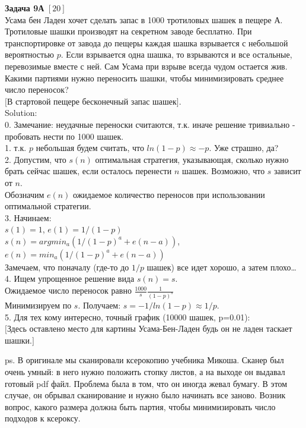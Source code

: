 \documentclass[12pt, a4paper]{article}\usepackage[]{graphicx}\usepackage[]{color}
\begin{document}
\textbf{Задача 9А} $[20]$ \\
Усама бен Ладен хочет сделать запас в 1000 тротиловых шашек в пещере А. Тротиловые шашки производят на секретном заводе бесплатно. При транспортировке от завода до пещеры каждая шашка взрывается с небольшой вероятностью $p$. Если взрывается одна шашка, то взрываются и все остальные, перевозимые вместе с ней. Сам Усама при взрыве всегда чудом остается жив. Какими партиями нужно переносить шашки, чтобы минимизировать среднее число переносок? \\
$[$В стартовой пещере бесконечный запас шашек$]$. \\
Solution: \\
0. Замечание: неудачные переноски считаются, т.к. иначе решение тривиально - пробовать нести по 1000 шашек.\\
1. т.к. $p$ небольшая будем считать, что $ln(1-p)\approx -p$. Уже страшно, да? \\
2. Допустим, что $s(n)$ оптимальная стратегия, указывающая, сколько нужно брать сейчас шашек, если осталось перенести $n$ шашек. Возможно, что $s$ зависит от $n$. \\
Обозначим $e(n)$ ожидаемое количество переносов при использовании оптимальной стратегии. \\
3. Начинаем: \\
$s(1)=1$, $e(1)=1/(1-p)$ \\
$s(n)=argmin_{a}(1/(1-p)^{a}+e(n-a))$, $e(n)=min_{a}(1/(1-p)^{a}+e(n-a))$ \\
Замечаем, что поначалу (где-то до $1/p$ шашек) все идет хорошо, а затем плохо\ldots \\
4. Ищем упрощенное решение вида $s(n)=s$. \\
Ожидаемое число переносок равно $\frac{1000}{s}\frac{1}{(1-p)^{s}}$ \\
Минимизируем по $s$. Получаем: $s=-1/ln(1-p)\approx 1/p$. \\
5. Для тех кому интересно, точный график (10000 шашек, p=0.01): \\

$[$Здесь оставлено место для картины Усама-Бен-Ладен будь он не ладен таскает шашки.$]$

ps. В оригинале мы сканировали ксерокопию учебника Микоша. Сканер был очень умный: в него нужно положить стопку листов, а на выходе он выдавал готовый pdf файл. Проблема была в том, что он иногда жевал бумагу. В этом случае, он обрывал сканирование и нужно было начинать все заново. Возник вопрос, какого размера должна быть партия, чтобы минимизировать число подходов к ксероксу.
\end{document}
